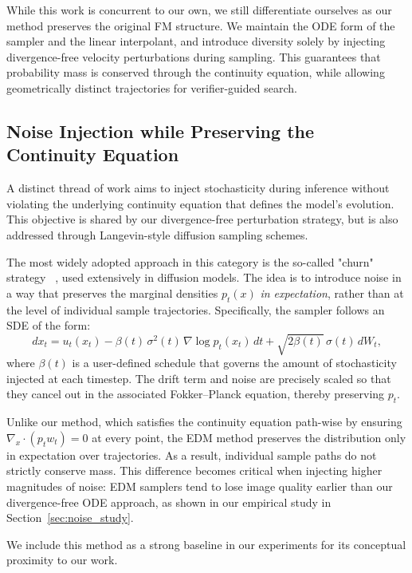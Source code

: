 \documentclass{article}
\begin{document}
While this work is concurrent to our own, we still differentiate ourselves as our method preserves the original FM structure. We maintain the ODE form of the sampler and the linear interpolant, and introduce diversity solely by injecting divergence-free velocity perturbations during sampling. This guarantees that probability mass is conserved through the continuity equation, while allowing geometrically distinct trajectories for verifier-guided search.

\subsection{Noise Injection while Preserving the Continuity Equation}

A distinct thread of work aims to inject stochasticity during inference without violating the underlying continuity equation that defines the model's evolution. This objective is shared by our divergence-free perturbation strategy, but is also addressed through Langevin-style diffusion sampling schemes.

The most widely adopted approach in this category is the so-called "churn" strategy ~\cite{karras2022elucidatingdesignspacediffusionbased}, used extensively in diffusion models. The idea is to introduce noise in a way that preserves the marginal densities \(p_t(x)\) \emph{in expectation}, rather than at the level of individual sample trajectories. Specifically, the sampler follows an SDE of the form:
\[
d x_t = u_t(x_t) - \beta(t)\,\sigma^2(t)\,\nabla \log p_t(x_t)\,dt + \sqrt{2\beta(t)}\,\sigma(t)\,dW_t,
\]
where \(\beta(t)\) is a user-defined schedule that governs the amount of stochasticity injected at each timestep. The drift term and noise are precisely scaled so that they cancel out in the associated Fokker–Planck equation, thereby preserving \(p_t\).

Unlike our method, which satisfies the continuity equation path-wise by ensuring \(\nabla_x\!\cdot(p_t w_t)=0\) at every point, the EDM method preserves the distribution only in expectation over trajectories. As a result, individual sample paths do not strictly conserve mass. This difference becomes critical when injecting higher magnitudes of noise: EDM samplers tend to lose image quality earlier than our divergence-free ODE approach, as shown in our empirical study in Section~\ref{sec:noise_study}.

We include this method as a strong baseline in our experiments for its conceptual proximity to our work.
\end{document}
